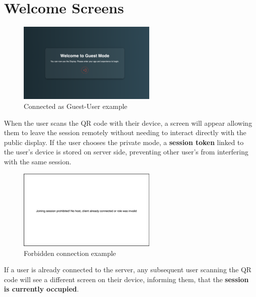 \section{Welcome Screens}

\begin{figure}[H]
    \centering
    \includegraphics[width=0.6\textwidth]{images/WelcomeScreen.png}
    \caption{Connected as Guest-User example}
\end{figure}
When the user scans the QR code with their device, a screen will appear allowing them to leave the 
session remotely without needing to interact directly with the public display. 
If the user chooses the private mode, a \textbf{session token} linked to the user's device is stored on server side, preventing other 
user's from interfering with the same session.

\begin{figure}[H]
    \centering
    \includegraphics[width=0.6\textwidth]{images/WelcomeScreenInvalid.png}
    \caption{Forbidden connection example}
\end{figure}
If a user is already connected to the server, any subsequent user scanning the QR code will see 
a different screen on their device, informing them, that the \textbf{session is currently occupied}.